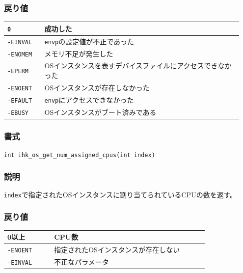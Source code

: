 \documentclass[twoside,11pt,fleqn]{book}
\begin{document}
\subsubsection*{戻り値}
\begin{table}[!h]
\footnotesize
\begin{tabular}{|p{0.15\linewidth}|p{0.80\linewidth}|} \hline
\verb:0:&	成功した\\ \hline
\verb:-EINVAL:&	\verb:envp:の設定値が不正であった\\ \hline
\verb:-ENOMEM:&	メモリ不足が発生した\\ \hline
\verb:-EPERM:&	OSインスタンスを表すデバイスファイルにアクセスできなかった\\ \hline
\verb:-ENOENT:&	OSインスタンスが存在しなかった\\ \hline
\verb:-EFAULT:&	\texttt{envp}にアクセスできなかった\\ \hline
\verb:-EBUSY:&OSインスタンスがブート済みである\\ \hline
\end{tabular}
\vspace{-0em}
\end{table}
\FloatBarrier

\subsubsection{}
\subsubsection*{書式}{\quad} \texttt{int ihk\_os\_get\_num\_assigned\_cpus(int index)}
\subsubsection*{説明}{\quad} \texttt{index}で指定されたOSインスタンスに割り当てられているCPUの数を返す。
\subsubsection*{戻り値}
\begin{table}[!h]
\footnotesize
\begin{tabular}{|p{0.20\linewidth}|p{0.66\linewidth}|} \hline
0以上&CPU数\\ \hline
\texttt{-ENOENT}&指定されたOSインスタンスが存在しない\\ \hline
\texttt{-EINVAL}&不正なパラメータ\\ \hline
\end{tabular}
\vspace{-0em}
\end{table}
\FloatBarrier
\end{document}
